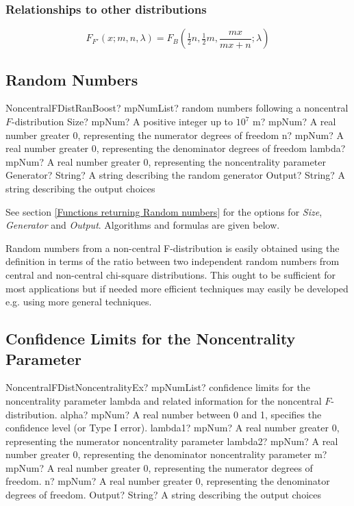 \subsubsection{Relationships to other distributions}
\begin{equation}
F_{F'}(x;m,n,\lambda) = F_B\left(\tfrac{1}{2} n, \tfrac{1}{2} m,\frac{mx}{mx+n};\lambda\right)
\end{equation}

\subsection{Random Numbers}
\label{NonCentralFDistributionRandom}


\begin{mpFunctionsExtract}
	\mpFunctionSixNotImplemented
	{NoncentralFDistRanBoost? mpNumList? random numbers following a noncentral $F$-distribution}
	{Size? mpNum? A positive integer up to $10^7$}
	{m? mpNum? A real number greater 0, representing the numerator  degrees of freedom}
	{n? mpNum? A real number greater 0, representing the denominator degrees of freedom}
	{lambda? mpNum? A real number greater 0, representing the noncentrality parameter}
	{Generator? String? A string describing the random generator}
	{Output? String? A string describing the output choices}
\end{mpFunctionsExtract}

\vspace{0.3cm}
See section \ref{Functions returning Random numbers} for the options for  {\itshape\sffamily Size},  {\itshape\sffamily Generator} and {\itshape\sffamily Output}. Algorithms and formulas are given below.

Random numbers from a non-central F-distribution is easily obtained using the definition in terms of the ratio between two independent random numbers from central and non-central chi-square distributions. This ought to be sufficient for most applications but if needed more efficient techniques may easily be developed e.g. using more general techniques.



\subsection{Confidence Limits for the Noncentrality Parameter}
\label{NoncentralFNoncentrality}

\begin{mpFunctionsExtract}
	\mpFunctionSixNotImplemented
	{NoncentralFDistNoncentralityEx? mpNumList? confidence limits for the noncentrality parameter lambda and related information for the noncentral $F$-distribution.}
	{alpha? mpNum? A real number between 0 and 1, specifies the confidence level (or Type I error).}
	{lambda1? mpNum? A real number greater 0, representing the numerator noncentrality parameter}
	{lambda2? mpNum? A real number greater 0, representing the denominator noncentrality parameter}
	{m? mpNum? A real number greater 0, representing the numerator  degrees of freedom.}
	{n? mpNum? A real number greater 0, representing the denominator degrees of freedom.}
	{Output? String? A string describing the output choices}
\end{mpFunctionsExtract}


